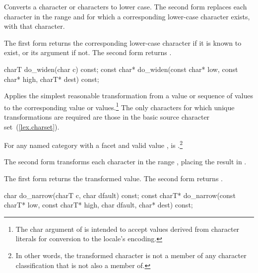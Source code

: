 \begin{itemdescr}
\pnum
\effects
Converts a character or characters to lower case.
The second form replaces each character
in the range
and for which a corresponding lower-case character exists,
with that character.

\pnum
\returns
The first form returns the corresponding lower-case character if it
is known to exist, or its argument if not.
The second form returns .
\end{itemdescr}

%
%
\begin{itemdecl}
charT        do_widen(char c) const;
const char*  do_widen(const char* low, const char* high,
                      charT* dest) const;
\end{itemdecl}

\begin{itemdescr}
\pnum
\effects
Applies the simplest reasonable transformation from a
value or sequence of
values to the corresponding
value or values.\footnote{The char argument of
is intended to accept values derived from character literals for conversion
to the locale's encoding.}
The only characters for which unique transformations are required
are those in the basic source character set~(\ref{lex.charset}).

For any named
category with a
facet  and valid
value ,
is
.\footnote{In other words, the transformed character is not a member
of any character classification that  is not also a member of.}

The second form transforms each character
in the range
,
placing the result in
.

\pnum
\returns
The first form returns the transformed value.
The second form returns .
\end{itemdescr}

%
%
\begin{itemdecl}
char         do_narrow(charT c, char dfault) const;
const charT* do_narrow(const charT* low, const charT* high,
                       char dfault, char* dest) const;
\end{itemdecl}

